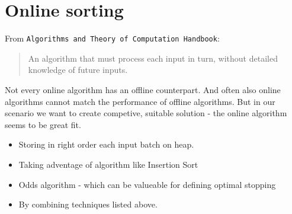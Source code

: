 \section*{Online sorting}
From \texttt{Algorithms and Theory of Computation Handbook}:
\begin{quote}
An algorithm that must process each input in turn, without detailed knowledge
of future inputs.
\end{quote}

Not every online algorithm has an offline counterpart. And often also online
algorithms cannot match the performance of offline algorithms.
But in our scenario we want to create competive, suitable solution - the online
algorithm seems to be great fit.

\begin{itemize}
	\item{Storing in right order each input batch on heap.}
	\item{Taking adventage of algorithm like Insertion Sort}
	\item{Odds algorithm - which can be valueable for defining optimal stopping}
  \item{By combining techniques listed above. }
\end{itemize}
